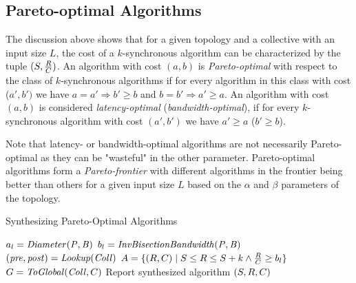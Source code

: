 \subsection{Pareto-optimal Algorithms}
\label{sec:pareto:optimal}
The discussion above shows that for a given topology and a collective with an input size $L$, the cost of a $k$-synchronous algorithm can be characterized by the tuple $(S, \frac{R}{C})$. An algorithm with cost $(a,b)$ is {\em Pareto-optimal} with respect to the class of $k$-synchronous algorithms if for every algorithm in this class with cost  ($a', b')$ we have $a = a' \Rightarrow b' \geq b$ and $b = b' \Rightarrow a' \geq a$.
An algorithm with cost $(a,b)$ is considered {\em latency-optimal} ({\em bandwidth-optimal}), if for every $k$-synchronous algorithm with cost
$(a',b')$ we have $a' \geq a$ ($b' \geq b$).

Note that latency- or bandwidth-optimal algorithms are not necessarily Pareto-optimal as they can be "wasteful" in the other parameter. Pareto-optimal algorithms form a {\em Pareto-frontier} with different algorithms in the frontier being better than others for a given input size $L$ based on the $\alpha$ and $\beta$ parameters of the topology.

\begin{algorithm}
	\caption{Synthesizing Pareto-Optimal Algorithms}
    \begin{algorithmic}[1]
        \State $a_l = \mathit{Diameter(P, B)}$
        \State $b_l = \mathit{InvBisectionBandwidth(P, B)}$
        \State $(\mathit{pre}, \mathit{post}) = \mathit{Lookup(Coll)}$ 
            \State $A = \{(R,C) \mid S \leq R \leq S+k \wedge \frac{R}{C} \geq b_l\}$
                \State $G=\mathit{ToGlobal}(\mathit{Coll},C)$
                \State Report synthesized algorithm $(S,R,C)$
                \EndIf
                \EndIf
			\EndFor
        \EndFor
        \EndProcedure
	\end{algorithmic}
\end{algorithm}

